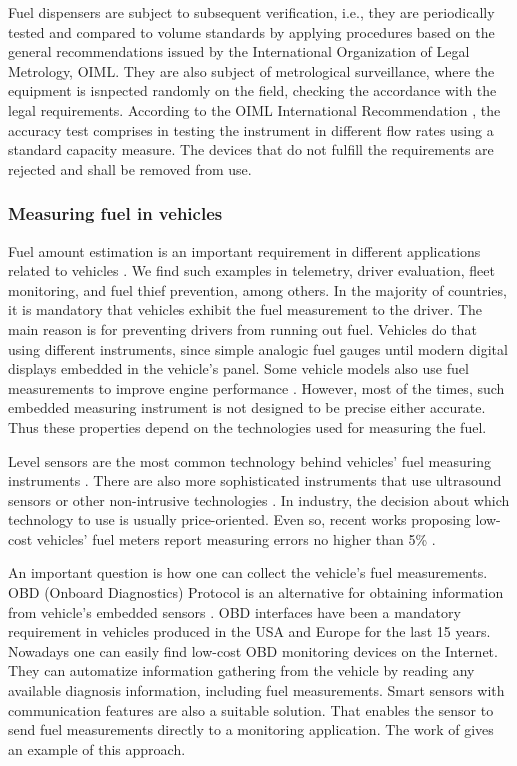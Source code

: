 \documentclass[sigplan]{acmart}
\begin{document}
Fuel dispensers are subject to subsequent verification, i.e., they are periodically tested and compared to volume standards by applying procedures based on the general recommendations issued by the International Organization of Legal Metrology, OIML. 
They are also subject of metrological surveillance, where the equipment is isnpected randomly on the field, checking the accordance with the legal requirements.
According to the OIML International Recommendation \cite{OIML2007}, the accuracy test comprises in testing the instrument in different flow rates using a standard capacity measure.
The devices that do not fulfill the requirements are rejected and shall be removed from use.

\subsubsection{Measuring fuel in vehicles}
\label{s:vmftech}
Fuel amount estimation is an important requirement in different applications related to vehicles \cite{Skog2014,Obikoya2014,Andria2016,Kumar2017,Ahmed2017,Patil2017}.
We find such examples in telemetry, driver evaluation, fleet monitoring, and fuel thief prevention, among others.
In the majority of countries, it is mandatory that vehicles exhibit the fuel measurement to the driver.
The main reason is for preventing drivers from running out fuel.
Vehicles do that using different instruments, since simple analogic fuel gauges until modern digital displays embedded in the vehicle's panel.
Some vehicle models also use fuel measurements to improve engine performance \cite{Skog2014}.
However, most of the times, such embedded measuring instrument is not designed to be precise either accurate.
Thus these properties depend on the technologies used for measuring the fuel.

Level sensors are the most common technology behind vehicles' fuel measuring instruments \cite{Obikoya2014}.
There are also more sophisticated instruments that use ultrasound sensors or other non-intrusive technologies \cite{Ahmed2017,Patil2017}.
In industry, the decision about which technology to use is usually price-oriented.
Even so, recent works proposing low-cost vehicles' fuel meters report measuring errors no higher than 5\% \cite{Obikoya2014,Ahmed2017,Kumar2017,Patil2017}.

An important question is how one can collect the vehicle's fuel measurements.
OBD (Onboard Diagnostics) Protocol is an alternative for obtaining information from vehicle's embedded sensors \cite{Andria2016}.
OBD interfaces have been a mandatory requirement in vehicles produced in the USA and Europe for the last 15 years.
Nowadays one can easily find low-cost OBD monitoring devices on the Internet. 
They can automatize information gathering from the vehicle by reading any available diagnosis information, including fuel measurements.
Smart sensors with communication features are also a suitable solution.
That enables the sensor to send fuel measurements directly to a monitoring application.
The work of \cite{Ahmed2017} gives an example of this approach.
\end{document}
